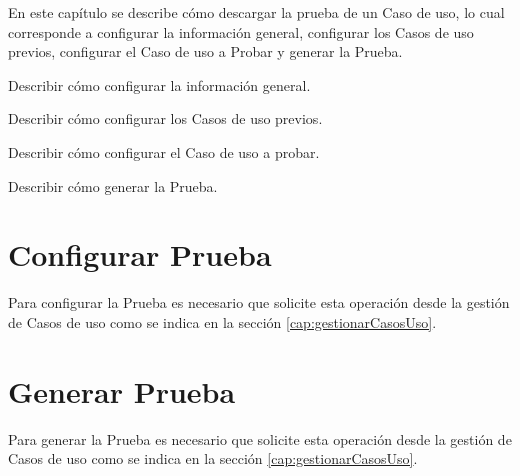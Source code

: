 
En este capítulo se describe cómo descargar la prueba de un Caso de uso, lo cual corresponde a configurar la información general, configurar los Casos de uso previos, configurar el Caso de uso a Probar y generar la Prueba.\\


\begin{objetivos}
	\item Describir cómo configurar la información general.
	\item Describir cómo configurar los Casos de uso previos.
	\item Describir cómo configurar el Caso de uso a probar.
	\item Describir cómo generar la Prueba.
\end{objetivos}

\section{Configurar Prueba}

Para configurar la Prueba es necesario que solicite esta operación desde la gestión de Casos de uso como se indica en la sección \ref{cap:gestionarCasosUso}.	
	





\section{Generar Prueba}

Para generar la Prueba es necesario que solicite esta operación desde la gestión de Casos de uso como se indica en la sección \ref{cap:gestionarCasosUso}.	


